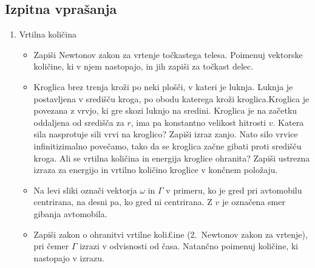 \newpage
\subsection*{Izpitna vprašanja}
\begin{enumerate}
    \item Vrtilna količina
    \begin{itemize}
        \item Zapiši Newtonov zakon za vrtenje točkastega telesa. Poimenuj vektorske količine, ki v njem nastopajo, in jih zapiši za točkast delec.
        \item Kroglica brez trenja kroži po neki plošči, v kateri je luknja. Luknja je postavljena v središču kroga, po obodu katerega kroži kroglica.Kroglica je povezana z vrvjo, ki gre skozi luknjo na sredini. Kroglica je na začetku oddaljena od središča za \(r\), ima pa konstantno velikost hitrosti \(v\). Katera sila nasprotuje sili vrvi na kroglico? Zapiši izraz zanjo. Nato silo vrvice infinitizimalno povečamo, tako da se kroglica začne gibati proti središču kroga. Ali se vrtilna količina in energija kroglice ohranita? Zapiši ustrezna izraza za energijo in vrtilno količino kroglice v končnem položaju.
        \item Na levi sliki označi vektorja \(\omega\) in \(\Gamma\) v primeru, ko je gred pri avtomobilu centrirana, na desni pa, ko gred ni centrirana. Z \(v\) je označena smer gibanja avtomobila.
        \item Zapiši zakon o ohranitvi vrtilne koli£ine (2.\ Newtonov zakon za vrtenje), pri čemer \(\Gamma\) izrazi v odvisnosti od časa. Natančno poimenuj količine, ki nastopajo v izrazu.
    \end{itemize}
\end{enumerate}